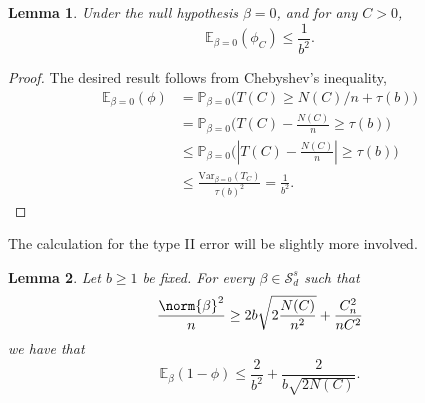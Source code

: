 \documentclass{article}
\newcommand{\abs}[1]{\left \lvert #1 \right \rvert}
\newcommand{\Var}{\mathrm{Var}}
\newcommand{\1}{\mathbb{I}}
\newcommand{\Pbb}{\mathbb{P}}
\newcommand{\Ebb}{\mathbb{E}}
\theoremstyle{alden}
\theoremstyle{aldenthm}
\newtheorem{lemma}{Lemma}
\theoremstyle{definition}
\theoremstyle{remark}
\begin{document}
\begin{lemma}
	\label{lem:type_I_error}
	Under the null hypothesis $\beta = 0$, and for any $C > 0$,
	\begin{equation*}
	\Ebb_{\beta = 0}(\phi_C) \leq \frac{1}{b^2}. 
	\end{equation*}
\end{lemma}
\begin{proof}
	The desired result follows from Chebyshev's inequality,
	\begin{align*}
	\Ebb_{\beta = 0}(\phi) & = \Pbb_{\beta = 0}\bigl(T(C) \geq N(C)/n + \tau(b)\bigr) \\ 
	& = \Pbb_{\beta = 0}\bigl(T(C) - \frac{N(C)}{n} \geq \tau(b)\bigr) \\
	& \leq \Pbb_{\beta = 0}\bigl(\abs{T(C) - \frac{N(C)}{n}} \geq \tau(b)\bigr) \\
	& \leq \frac{\Var_{\beta = 0}(T_C)}{\tau(b)^2} = \frac{1}{b^2}.
	\end{align*}
\end{proof}
The calculation for the type II error will be slightly more involved.
\begin{lemma}
	\label{lem:type_II}
	Let $b \geq 1$ be fixed. For every $\beta \in \mathcal{S}_d^s$ such that
	\begin{equation}
	\label{eqn:type_II}
	\frac{\norm{\beta}^2}{n} \geq 2b\sqrt{2\frac{N(C)}{n^2}} + \frac{C_n^2}{nC^2}
	\end{equation}
	we have that
	\begin{equation*}
	\Ebb_{\beta}(1 - \phi) \leq \frac{2}{b^2} + \frac{2}{b\sqrt{2N(C)}}.
	\end{equation*}
\end{lemma}
\end{document}
